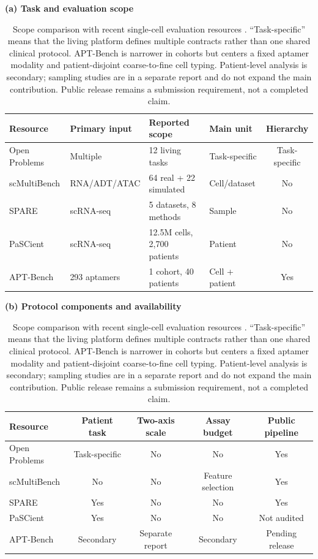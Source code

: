 \begin{table}[t]
\centering
\small
\setlength{\tabcolsep}{6pt}
\textbf{(a) Task and evaluation scope}\\[3pt]
\begin{tabular}{llllc}
\toprule
Resource & Primary input & Reported scope & Main unit & Hierarchy \\
\midrule
Open Problems & Multiple & 12 living tasks & Task-specific & Task-specific \\
scMultiBench & RNA/ADT/ATAC & 64 real + 22 simulated & Cell/dataset & No \\
SPARE & scRNA-seq & 5 datasets, 8 methods & Sample & No \\
PaSCient & scRNA-seq & 12.5M cells, 2,700 patients & Patient & No \\
APT-Bench & 293 aptamers & 1 cohort, 40 patients & Cell + patient & Yes \\
\bottomrule
\end{tabular}
\vspace{6pt}

\textbf{(b) Protocol components and availability}\\[3pt]
\begin{tabular}{lcccc}
\toprule
Resource & Patient task & Two-axis scale & Assay budget & Public pipeline \\
\midrule
Open Problems & Task-specific & No & No & Yes \\
scMultiBench & No & No & Feature selection & Yes \\
SPARE & Yes & No & No & Yes \\
PaSCient & Yes & No & No & Not audited \\
APT-Bench & Secondary & Separate report & Secondary & Pending release \\
\bottomrule
\end{tabular}
\caption{Scope comparison with recent single-cell evaluation resources
\citep{luecken2025open,liu2025multitask,shitov2025spare,liu2026pascient}.
``Task-specific'' means that the living platform defines multiple contracts
rather than one shared clinical protocol. APT-Bench is narrower in cohorts but
centers a fixed aptamer modality and patient-disjoint coarse-to-fine cell
typing. Patient-level analysis is secondary; sampling studies are in a separate
report and do not expand the main contribution. Public release remains a submission requirement, not a completed
claim.}
\label{tab:benchmark_comparison}
\end{table}
